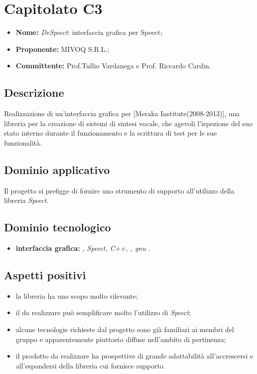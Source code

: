 \documentclass[openany,12pt,a4paper]{report}
\begin{document}
	\section{Capitolato C3}

	\begin{itemize}
		\item \textbf{Nome:} \textit{DeSpeect}: interfaccia grafica per Speect;
		\item \textbf{Proponente:} MIVOQ S.R.L.;
		\item \textbf{Committente:} Prof.Tullio Vardanega e Prof. Riccardo Cardin.
	\end{itemize}

	\subsection{Descrizione}

	Realizzazione di un'interfaccia grafica per  [Meraka Institute(2008-2013)], una libreria per la creazione di sistemi di sintesi vocale, che agevoli l’ispezione del suo stato interno durante il funzionamento e la scrittura di test per le sue funzionalità.


	\subsection{Dominio applicativo}

	Il progetto si prefigge di fornire uno strumento di supporto all'utilizzo della libreria \textit{Speect}.

	\subsection{Dominio tecnologico}

	\begin{itemize}
		\item \textbf{interfaccia grafica:} \textit{ , Speect, C++, , gnu .}
	\end{itemize}

	\subsection{Aspetti positivi}

	\begin{itemize}
		\item la libreria ha uno scopo molto rilevante;

		\item il  da realizzare può semplificare molto l'utilizzo di \textit{Speect};

		\item alcune tecnologie richieste dal progetto sono già familiari ai membri del gruppo e apparentemente piuttosto diffuse nell'ambito di pertinenza;

		\item il prodotto da realizzare ha prospettive di grande adattabilità all'accrescersi e all'espandersi della libreria cui fornisce supporto.
	\end{itemize}
\end{document}
